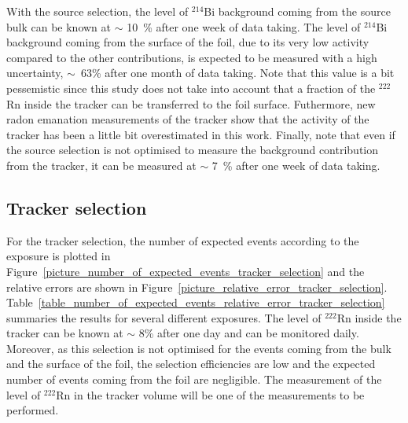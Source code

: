 \documentclass[main.tex]{subfiles}
\begin{document}
\bigskip

\noindent With the source selection, the level of $^{\text{214}}$Bi background coming from the source bulk can be known at $\sim$ 10~\% after one week of data taking. The level of $^{\text{214}}$Bi background coming from the surface of the foil, due to its very low activity compared to the other contributions, is expected to be measured with a high uncertainty, $\sim$~63\% after one month of data taking. Note that this value is a bit pessemistic since this study does not take into account that a fraction of the $^{\text{222}}$Rn inside the tracker can be transferred to the foil surface. Futhermore, new radon emanation  measurements of the tracker show that the activity of the tracker has been a little bit overestimated in this work. Finally, note that even if the source selection is not optimised to measure the background contribution from the tracker, it can be measured at $\sim$ 7~\% after one week of data taking.  


\FloatBarrier


\subsection{Tracker selection}


\noindent For the tracker selection, the number of expected events according to the exposure is plotted in Figure~\ref{picture_number_of_expected_events_tracker_selection} and the relative errors are shown in Figure~\ref{picture_relative_error_tracker_selection}. Table~\ref{table_number_of_expected_events_relative_error_tracker_selection} summaries the results for several different exposures. The level of $^{\text{222}}$Rn inside the tracker can be known at $\sim$ 8\% after one day and can be monitored daily. Moreover, as this selection is not optimised for the events coming from the bulk and the surface of the foil, the selection efficiencies are low and the expected number of events coming from the foil are negligible. The measurement of the level of $^{\text{222}}$Rn in the tracker volume will be one of the measurements to be performed.


 
\end{document}
